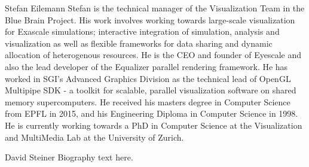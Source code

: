 \documentclass[10pt,journal,compsoc]{IEEEtran}
\begin{document}
%

\begin{IEEEbiography}{
Stefan Eilemann} Stefan is the technical manager of the Visualization Team in
the Blue
Brain Project. His work involves working towards large-scale visualization for
Exascale simulations; interactive integration of simulation, analysis and
visualization as well as flexible frameworks for data sharing and dynamic
allocation of heterogenous resources. He is the CEO and founder of Eyescale and
also the lead developer of the \textsf{Equalizer} parallel rendering framework.
He has worked in SGI's Advanced Graphics Division as the technical lead of
OpenGL Multipipe SDK - a toolkit for scalable, parallel visualization software
on shared memory supercomputers. He received his masters degree in Computer
Science from EPFL in 2015, and his Engineering Diploma in Computer Science in
1998. He is currently working towards a PhD in Computer Science at the
Visualization and MultiMedia Lab at the University of Zurich.
\end{IEEEbiography}

\begin{IEEEbiographynophoto}{David Steiner}
Biography text here.
\end{IEEEbiographynophoto}

\end{document}
